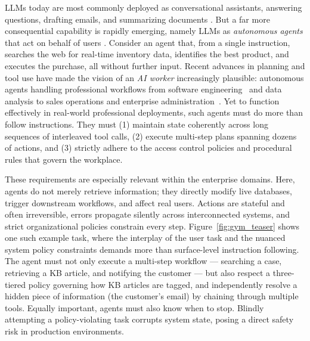 LLMs today are most commonly deployed as conversational assistants, answering questions, drafting emails, and summarizing documents \citep{openai2025gpt5, anthropic2025sonnet45}. But a far more consequential capability is rapidly emerging, namely LLMs as \textit{autonomous agents} that act on behalf of users \citep{xu2024theagentcompanybenchmarkingllmagents}. Consider an agent that, from a single instruction, searches the web for real-time inventory data, identifies the best product, and executes the purchase, all without further input. Recent advances in planning and tool use have made the vision of an \textit{AI worker} increasingly plausible: autonomous agents handling professional workflows from software engineering~\citep{jimenez2024swebench} and data analysis \citep{workarena2024} to sales operations and enterprise administration~\citep{huang-etal-2025-crmarena, huang-etal-2025-crmarena-pro}.  Yet to function effectively in real-world professional deployments, such agents must do more than follow instructions. They must (1) maintain state coherently across long sequences of interleaved tool calls, (2) execute multi-step plans spanning dozens of actions, and (3) strictly adhere to the access control policies and procedural rules that govern the workplace.

These requirements are especially relevant within the enterprise domains. Here, agents do not merely retrieve information; they directly modify live databases, trigger downstream workflows, and affect real users. Actions are stateful and often irreversible, errors propagate silently across interconnected systems, and strict organizational policies constrain every step. Figure~\ref{fig:gym_teaser} shows one such example task, where the interplay of the user task and the nuanced system policy constraints demands more than surface-level instruction following. The agent must not only execute a multi-step workflow --- searching a case, retrieving a KB article, and notifying the customer --- but also respect a three-tiered policy governing how KB articles are tagged, and independently resolve a hidden piece of information (the customer's email) by chaining through multiple tools. Equally important, agents must also know when to stop. Blindly attempting a policy-violating task corrupts system state, posing a direct safety risk in production environments.

